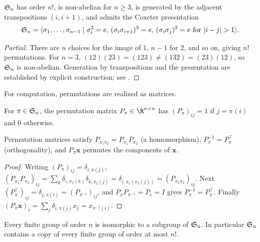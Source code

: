 \begin{proposition}
\label{prop:groups:sn-properties}
$\mathfrak{S}_n$ has order $n!$, is non-abelian for $n \geq 3$, is generated by the
adjacent transpositions $(i, i+1)$, and admits the Coxeter presentation
\begin{equation}
  \mathfrak{S}_n = \langle \sigma_1, \dots, \sigma_{n-1} \mid \sigma_i^2 = e,\,
    (\sigma_i \sigma_{i+1})^3 = e,\, (\sigma_i \sigma_j)^2 = e \text{ for }
    |i-j| > 1 \rangle.
\end{equation}
\end{proposition}

\begin{proof}[Partial]
There are $n$ choices for the image of $1$, $n-1$ for $2$, and so on, giving $n!$
permutations. For $n = 3$, $(12)(23) = (123) \neq (132) = (23)(12)$, so
$\mathfrak{S}_n$ is non-abelian. Generation by transpositions and the presentation are
established by explicit construction; see \citet{dummit2004abstract}.
\end{proof}

For computation, permutations are realized as matrices.

\begin{definition}
\label{def:groups:permutation-matrix}
For $\pi \in \mathfrak{S}_n$, the permutation matrix $P_\pi \in \R^{n \times n}$ has
$(P_\pi)_{ij} = 1$ if $j = \pi(i)$ and $0$ otherwise.
\end{definition}

\begin{proposition}
\label{prop:groups:permutation-matrix-properties}
Permutation matrices satisfy $P_{\pi_1 \pi_2} = P_{\pi_1} P_{\pi_2}$ (a
homomorphism), $P_\pi^{-1} = P_\pi^\top$ (orthogonality), and $P_\pi \mathbf{x}$
permutes the components of $\mathbf{x}$.
\end{proposition}

\begin{proof}
Writing $(P_\pi)_{ij} = \delta_{i, \pi(j)}$, $(P_{\pi_1} P_{\pi_2})_{ij} =
\sum_k \delta_{i, \pi_1(k)} \delta_{k, \pi_2(j)} = \delta_{i, \pi_1(\pi_2(j))} =
(P_{\pi_1 \pi_2})_{ij}$. Next $(P_\pi^\top)_{ij} = \delta_{j, \pi(i)} =
(P_{\pi^{-1}})_{ij}$, and $P_\pi P_{\pi^{-1}} = P_e = I$ gives $P_\pi^{-1} =
P_\pi^\top$. Finally $(P_\pi \mathbf{x})_i = \sum_j \delta_{i, \pi(j)} x_j =
x_{\pi^{-1}(i)}$.
\end{proof}

\begin{theorem}
\label{thm:groups:cayley}
Every finite group of order $n$ is isomorphic to a subgroup of $\mathfrak{S}_n$. In
particular $\mathfrak{S}_n$ contains a copy of every finite group of order at most $n!$.
\end{theorem}

